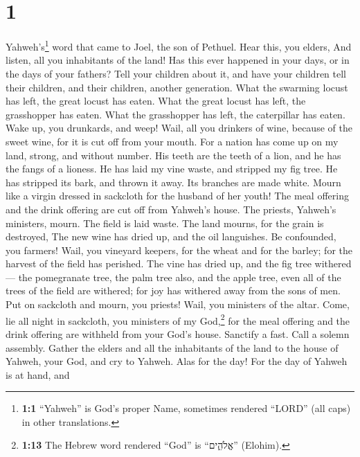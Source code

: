 \hypertarget{section}{%
\section{1}\label{section}}

 Yahweh's\footnote{\textbf{1:1} ``Yahweh'' is God's proper
  Name, sometimes rendered ``LORD'' (all caps) in other translations.}
word that came to Joel, the son of Pethuel.  Hear this,
you elders, And listen, all you inhabitants of the land! Has this ever
happened in your days, or in the days of your fathers? 
Tell your children about it, and have your children tell their children,
and their children, another generation.  What the swarming
locust has left, the great locust has eaten. What the great locust has
left, the grasshopper has eaten. What the grasshopper has left, the
caterpillar has eaten.  Wake up, you drunkards, and weep!
Wail, all you drinkers of wine, because of the sweet wine, for it is cut
off from your mouth.  For a nation has come up on my land,
strong, and without number. His teeth are the teeth of a lion, and he
has the fangs of a lioness.  He has laid my vine waste,
and stripped my fig tree. He has stripped its bark, and thrown it away.
Its branches are made white.  Mourn like a virgin dressed
in sackcloth for the husband of her youth!  The meal
offering and the drink offering are cut off from Yahweh's house. The
priests, Yahweh's ministers, mourn.  The field is laid
waste. The land mourns, for the grain is destroyed, The new wine has
dried up, and the oil languishes.  Be confounded, you
farmers! Wail, you vineyard keepers, for the wheat and for the barley;
for the harvest of the field has perished.  The vine has
dried up, and the fig tree withered--- the pomegranate tree, the palm
tree also, and the apple tree, even all of the trees of the field are
withered; for joy has withered away from the sons of men.
 Put on sackcloth and mourn, you priests! Wail, you
ministers of the altar. Come, lie all night in sackcloth, you ministers
of my God,\footnote{\textbf{1:13} The Hebrew word rendered ``God'' is
  ``אֱלֹהִ֑ים'' (Elohim).} for the meal offering and the drink offering
are withheld from your God's house.  Sanctify a fast.
Call a solemn assembly. Gather the elders and all the inhabitants of the
land to the house of Yahweh, your God, and cry to Yahweh.
 Alas for the day! For the day of Yahweh is at hand, and
